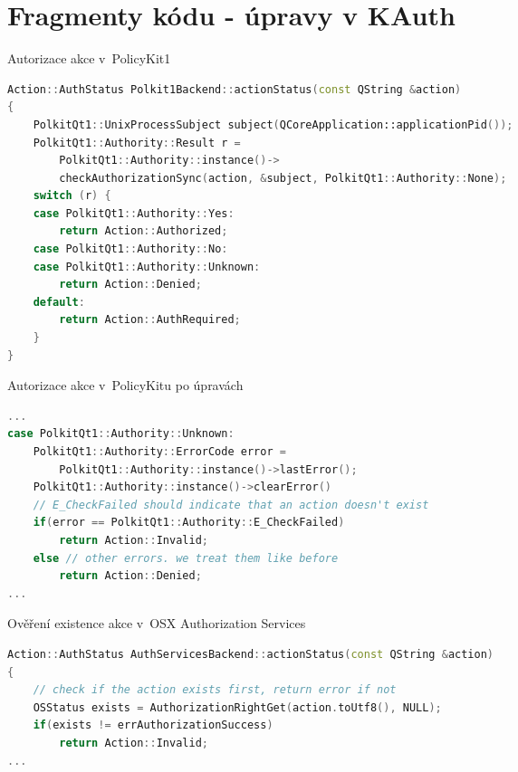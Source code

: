 \chapter{Fragmenty kódu - úpravy v KAuth}
\begin{mylisting}
\caption{Autorizace akce v~PolicyKit1}
\label{kauth-oldmethod}
\begin{lstlisting}[language=C++]
Action::AuthStatus Polkit1Backend::actionStatus(const QString &action)
{
    PolkitQt1::UnixProcessSubject subject(QCoreApplication::applicationPid());
    PolkitQt1::Authority::Result r =
        PolkitQt1::Authority::instance()->
        checkAuthorizationSync(action, &subject, PolkitQt1::Authority::None);
    switch (r) {
    case PolkitQt1::Authority::Yes:
        return Action::Authorized;
    case PolkitQt1::Authority::No:
    case PolkitQt1::Authority::Unknown:
        return Action::Denied;
    default:
        return Action::AuthRequired;
    }
}
\end{lstlisting}
\end{mylisting}
\begin{mylisting}
\caption{Autorizace akce v~PolicyKitu po úpravách}
\label{kauth-newmethod}
\begin{lstlisting}[language=C++]
...
case PolkitQt1::Authority::Unknown:
    PolkitQt1::Authority::ErrorCode error =
        PolkitQt1::Authority::instance()->lastError();
    PolkitQt1::Authority::instance()->clearError()
    // E_CheckFailed should indicate that an action doesn't exist
    if(error == PolkitQt1::Authority::E_CheckFailed)
        return Action::Invalid;
    else // other errors. we treat them like before
        return Action::Denied;
...
\end{lstlisting}
\end{mylisting}

\begin{mylisting}
\caption{Ověření existence akce v~OSX Authorization Services}
\label{osxverify}
\begin{lstlisting}[language=C++]
Action::AuthStatus AuthServicesBackend::actionStatus(const QString &action)
{
    // check if the action exists first, return error if not
    OSStatus exists = AuthorizationRightGet(action.toUtf8(), NULL);
    if(exists != errAuthorizationSuccess)
        return Action::Invalid;
...
\end{lstlisting}
\end{mylisting}

